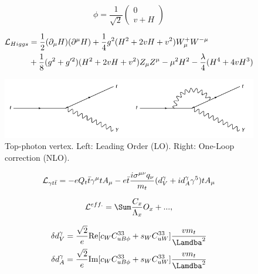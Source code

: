 \begin{equation}
\phi = \frac{1}{\sqrt{2}}
\begin{pmatrix}
0 \\
v + H
\end{pmatrix}
\end{equation}

\begin{equation}
\begin{split}
\mathcal{L}_{Higgs} & = \frac{1}{2}(\partial_{\mu}H)(\partial^{\mu}H) + \frac{1}{4}g^2 (H^2 + 2vH + v^2) W^+_{\mu} W^{-\mu} \\
& + \frac{1}{8} (g^2 + g'^2) (H^2 + 2vH + v^2) Z_{\mu} Z^{\mu} - \mu^2 H^2 - \frac{\lambda}{4} (H^4 + 4vH^3)
\end{split}
\end{equation}

\begin{figure}
\begin{center}
\includegraphics[width=\textwidth]{Figures/TopPhotonVertex.png}
\caption{Top-photon vertex. Left: Leading Order (LO). Right: One-Loop correction (NLO).}
\end{center}
\end{figure}

\begin{equation} \label{eqn-interactionlagrangian}
\mathcal{L}_{\gamma t\bar{t}} = -eQ_t\bar{t}\gamma^{\mu}tA_{\mu} - e\bar{t}\frac{i\sigma^{\mu\nu}q_{\nu}}{m_t}(d^{\gamma}_V+id^{\gamma}_A\gamma^5)tA_{\mu}
\end{equation}

\begin{equation}
\lumi^{eff.} = \Sum \frac{C_x}{\Lambda_x}O_x + ... ,
\end{equation}

\begin{align}\label{eqn-smparameterisations}
\delta d^{\gamma}_V = \frac{\sqrt{2}}{e}\text{Re}[c_WC^{33}_{uB\phi} + s_WC^{33}_{uW}]\frac{vm_t}{\Lamdba^2} \\
\delta d^{\gamma}_A = \frac{\sqrt{2}}{e}\text{Im}[c_WC^{33}_{uB\phi} + s_WC^{33}_{uW}]\frac{vm_t}{\Lamdba^2}
\end{align}

